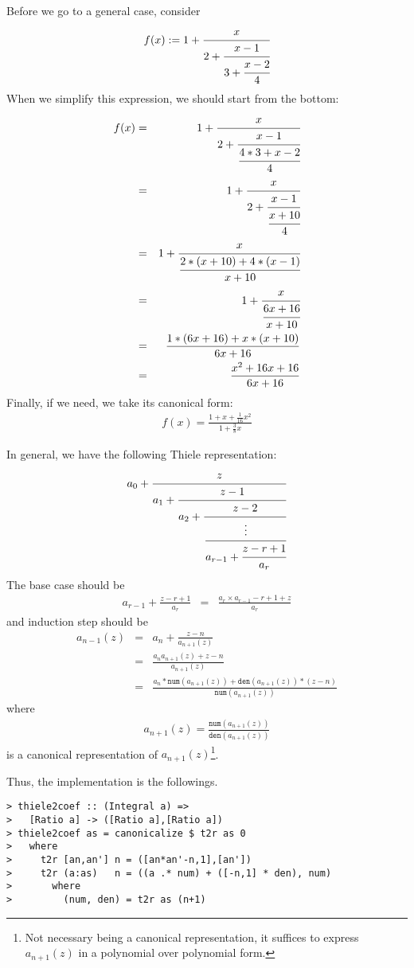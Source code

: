 \documentclass[11pt]{book}
\begin{document}
Before we go to a general case, consider
\begin{eqnarray}
f(x) := 1 + \cfrac{x}{2+\cfrac{x-1}{3+\cfrac{x-2}{4}}} 
\end{eqnarray}
When we simplify this expression, we should start from the bottom:
\begin{eqnarray}
f(x) &=& 1 + \cfrac{x}{2+\cfrac{x-1}{\cfrac{4*3+x-2}{4}}} \\
&=& 1 + \cfrac{x}{2+\cfrac{x-1}{\cfrac{x+10}{4}}} \\
&=& 1 + \cfrac{x}{\cfrac{2*(x+10) +4*(x-1)}{x+10}} \\
&=& 1 + \cfrac{x}{\cfrac{6x+16}{x+10}} \\
&=& \frac{1*(6x+16) + x*(x+10)}{6x+16} \\
&=& \frac{x^2+16x+16}{6x+16}
\end{eqnarray}
Finally, if we need, we take its canonical form:
\begin{eqnarray}
f(x) = \frac{1+ x+ \frac{1}{16}x^2}{1+ \frac{3}{8} x}
\end{eqnarray}

In general, we have the following Thiele representation:
\begin{eqnarray}
a_0 + \cfrac{z}{a_1 + \cfrac{z-1}{a_2 + \cfrac{z- 2}{ \cfrac{\vdots}{a_{r-1} + \cfrac{z-r+1}{a_r}}}}}
\end{eqnarray}
The base case should be
\begin{eqnarray}
a_{r-1}+ \frac{z-r+1}{a_r} &=& \frac{a_r\times a_{r-1}-r+1 + z }{a_r} 
\end{eqnarray}
and induction step should be
\begin{eqnarray}
a_{n-1}(z)
&=&a_{n}+ \frac{z-n}{a_{n+1}(z)} \\
&=& \frac{a_{n}a_{n+1}(z)+ z -n}{a_{n+1}(z)} \\
&=& \frac{a_{n}*\texttt{num}\left(a_{n+1}(z) \right)+ \texttt{den}\left(a_{n+1}(z) \right) * \left(z -n\right)}{\texttt{num}\left(a_{n+1}(z) \right)} 
\end{eqnarray}
where
\begin{eqnarray}
a_{n+1}(z) = \frac{\texttt{num}\left(a_{n+1}(z) \right)}{\texttt{den}\left(a_{n+1}(z) \right)}
\end{eqnarray}
is a canonical representation of $a_{n+1}(z)$\footnote{
Not necessary being a canonical representation, it suffices to express $a_{n+1}(z)$ in a polynomial over polynomial form.
}.

Thus, the implementation is the followings.
\begin{verbatim}
> thiele2coef :: (Integral a) => 
>   [Ratio a] -> ([Ratio a],[Ratio a])
> thiele2coef as = canonicalize $ t2r as 0
>   where
>     t2r [an,an'] n = ([an*an'-n,1],[an'])
>     t2r (a:as)   n = ((a .* num) + ([-n,1] * den), num)
>       where
>         (num, den) = t2r as (n+1)\end{verbatim}
\end{document}
